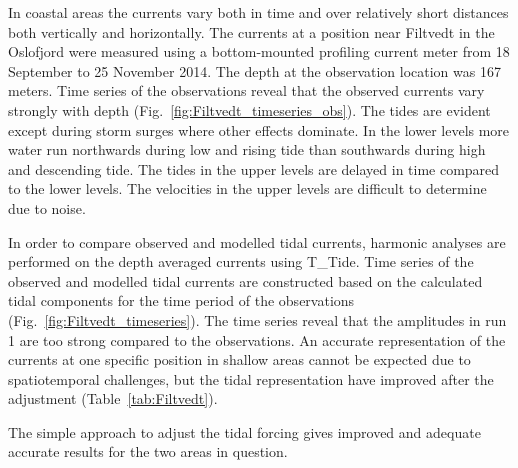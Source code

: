 In coastal areas the currents vary both in time and over relatively short distances both vertically and horizontally. The currents at a position near Filtvedt in the Oslofjord were measured using a bottom-mounted profiling current meter from 18 September to 25 November 2014. The depth at the observation location was 167 meters. Time series of the observations reveal that the observed currents vary strongly with depth (Fig.~\ref{fig:Filtvedt_timeseries_obs}). The tides are evident except during storm surges where other effects dominate. In the lower levels more water run northwards during low and rising tide than southwards during high and descending tide. The tides in the upper levels are delayed in time compared to the lower levels. The velocities in the upper levels are difficult to determine due to noise. 

In order to compare observed and modelled tidal currents, harmonic analyses are performed on the depth averaged currents using T\_Tide. Time series of the observed and modelled tidal currents are constructed based on the calculated tidal components for the time period of the observations (Fig.~\ref{fig:Filtvedt_timeseries}). The time series reveal that the amplitudes in run 1 are too strong compared to the observations. 
An accurate representation of the currents at one specific position in shallow areas cannot be expected due to spatiotemporal challenges, but the tidal representation have improved after the adjustment (Table~\ref{tab:Filtvedt}). %

The simple approach to adjust the tidal forcing gives improved and adequate accurate results for the two areas in question. 



